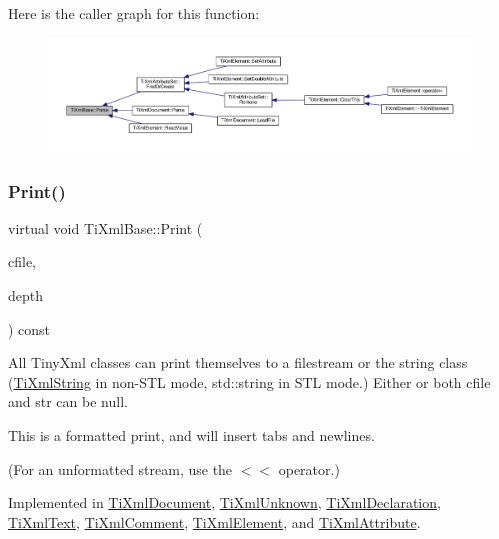 Here is the caller graph for this function\+:
\nopagebreak
\begin{figure}[H]
\begin{center}
\leavevmode
\includegraphics[width=350pt]{class_ti_xml_base_a00e4edb0219d00a1379c856e5a1d2025_icgraph}
\end{center}
\end{figure}
\mbox{\label{class_ti_xml_base_a0de56b3f2ef14c65091a3b916437b512}} 
\subsubsection{\texorpdfstring{Print()}{Print()}}
{\footnotesize\ttfamily virtual void Ti\+Xml\+Base\+::\+Print (\begin{DoxyParamCaption}\item[{F\+I\+LE $\ast$}]{cfile,  }\item[{int}]{depth }\end{DoxyParamCaption}) const\hspace{0.3cm}{\ttfamily [pure virtual]}}

All Tiny\+Xml classes can print themselves to a filestream or the string class (\hyperlink{class_ti_xml_string}{Ti\+Xml\+String} in non-\/\+S\+TL mode, std\+::string in S\+TL mode.) Either or both cfile and str can be null.

This is a formatted print, and will insert tabs and newlines.

(For an unformatted stream, use the $<$$<$ operator.) 

Implemented in \hyperlink{class_ti_xml_document_aa9e166fae51da603641380a964f21eeb}{Ti\+Xml\+Document}, \hyperlink{class_ti_xml_unknown_a5793fbc48ab3419783c0e866ca2d334e}{Ti\+Xml\+Unknown}, \hyperlink{class_ti_xml_declaration_ae46cff6565f299210ab945e78bf28514}{Ti\+Xml\+Declaration}, \hyperlink{class_ti_xml_text_a75f6895906333894e2574cc8cf77ea79}{Ti\+Xml\+Text}, \hyperlink{class_ti_xml_comment_a873171beac19d40f0eaae945711c98ed}{Ti\+Xml\+Comment}, \hyperlink{class_ti_xml_element_aa31a15cddfb8601a31236fe7d2569fb4}{Ti\+Xml\+Element}, and \hyperlink{class_ti_xml_attribute_a68ae373e03b9c35be4c9d0c3c233b894}{Ti\+Xml\+Attribute}.

